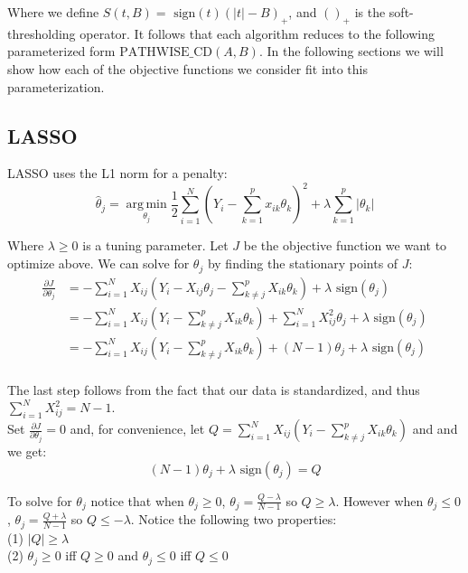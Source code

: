 \documentclass[11pt]{article}
\newcommand{\thh}{\hat{\theta}}
\newcommand{\sgn}{\text{ sign}}
\DeclareMathOperator*{\argmin}{arg\,min}
\newcommand{\pcd}{\text{PATHWISE\_CD}}
\begin{document}
Where we define\cite{ht} $S(t,B) = \sgn(t)(|t|-B)_+$, and $()_+$ is the soft-thresholding operator.  It follows that each algorithm reduces to the following parameterized form $\pcd(A, B)$.  In the following sections we will show how each of the objective functions we consider fit into this parameterization.  

\subsection{LASSO}
LASSO uses the L1 norm for a penalty:
	$$\thh_j = \argmin\limits_{\theta_j} \frac{1}{2} \sum\limits_{i=1}^N \left(Y_i - \sum\limits_{k=1}^px_{ik}\theta_k \right)^2 + \lambda \sum\limits_{k=1}^p|\theta_k|$$

Where $\lambda \geq 0$ is a tuning parameter.  Let $J$ be the objective function we want to optimize above.  We can solve for $\theta_j$ by finding the stationary points of $J$:
\begin{equation}\begin{split}
	\frac{\partial J}{\partial \theta_j}
		& = -\sum\limits_{i=1}^N X_{ij}(Y_i - X_{ij}\theta_j - \sum\limits_{k \ne j}^p X_{ik}\theta_k) + \lambda \sgn(\theta_j) \\
		& = -\sum\limits_{i=1}^N X_{ij}(Y_i - \sum\limits_{k \ne j}^p X_{ik}\theta_k) + \sum\limits_{i=1}^NX_{ij}^2\theta_j + \lambda \sgn(\theta_j) \\
		& = -\sum\limits_{i=1}^N X_{ij}(Y_i - \sum\limits_{k \ne j}^p X_{ik}\theta_k) +(N-1)\theta_j + \lambda \sgn(\theta_j) \\
\end{split}\end{equation}

The last step follows from the fact that our data is standardized, and thus $\sum\limits_{i=1}^NX_{ij}^2 = N-1$.  \\

Set $\frac{\partial J}{\partial \theta_j}=0$ and, for convenience, let $Q = \sum\limits_{i=1}^N X_{ij}(Y_i - \sum\limits_{k \ne j}^p X_{ik}\theta_k)$ and and we get:
	$$(N-1)\theta_j + \lambda\sgn(\theta_j) = Q$$

To solve for $\theta_j$ notice that when $\theta_j \geq 0$, $\theta_j=\frac{Q-\lambda}{N-1}$ so $Q \geq \lambda$.  However when $\theta_j \leq 0$, $\theta_j=\frac{Q+\lambda}{N-1}$ so $Q \leq -\lambda$.  Notice the following two properties: \\
	\hspace*{1cm} (1) $|Q| \geq \lambda$ \\
	\hspace*{1cm} (2) $\theta_j \geq 0$ iff $Q \geq 0$ and $\theta_j \leq 0$ iff $Q \leq 0$ \\
\end{document}

